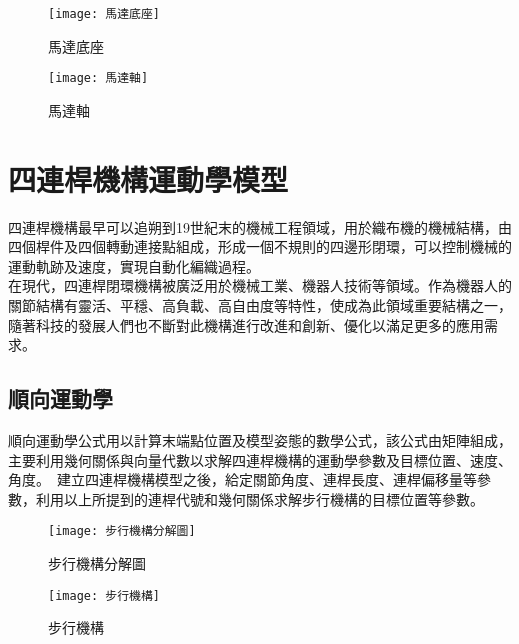 \begin{figure}[htbp]
  \begin{minipage}[t]{0.45\linewidth}
    \centering
    \texttt{[image: 馬達底座]}
    \caption{馬達底座}
    \label{馬達底座}
  \end{minipage}
  \hfill
  \begin{minipage}[t]{0.45\linewidth}
    \centering
    \texttt{[image: 馬達軸]}
    \caption{馬達軸}
    \label{馬達軸}
  \end{minipage}
\end{figure}

\newpage

\section{四連桿機構運動學模型}

四連桿機構最早可以追朔到19世紀末的機械工程領域，用於織布機的機械結構，由四個桿件及四個轉動連接點組成，形成一個不規則的四邊形閉環，可以控制機械的運動軌跡及速度，實現自動化編織過程。\\
在現代，四連桿閉環機構被廣泛用於機械工業、機器人技術等領域。作為機器人的關節結構有靈活、平穩、高負載、高自由度等特性，使成為此領域重要結構之一，隨著科技的發展人們也不斷對此機構進行改進和創新、優化以滿足更多的應用需求。\\

\subsection{順向運動學}
順向運動學公式用以計算末端點位置及模型姿態的數學公式，該公式由矩陣組成，主要利用幾何關係與向量代數以求解四連桿機構的運動學參數及目標位置、速度、角度。\
建立四連桿機構模型之後，給定關節角度、連桿長度、連桿偏移量等參數，利用以上所提到的連桿代號和幾何關係求解步行機構的目標位置等參數。\\

\begin{figure}[htbp]
  \begin{minipage}[t]{0.45\linewidth}
    \centering
    \texttt{[image: 步行機構分解圖]}
    \caption{步行機構分解圖}
    \label{步行機構分解圖}
  \end{minipage}
  \hfill
  \begin{minipage}[t]{0.45\linewidth}
    \centering
    \texttt{[image: 步行機構]}
    \caption{步行機構}
    \label{步行機構}
  \end{minipage}
\end{figure}

